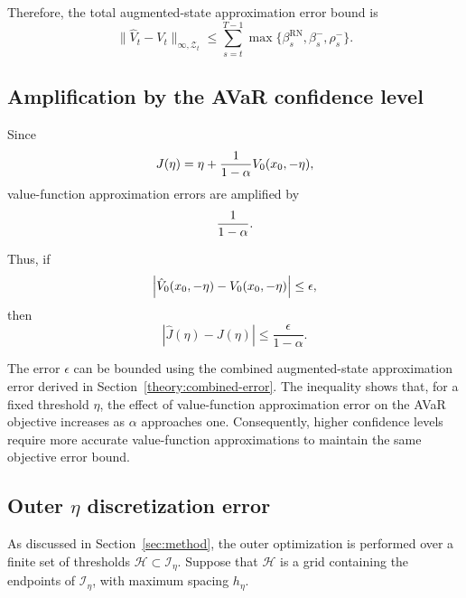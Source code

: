 Therefore, the total augmented-state approximation error bound is
\begin{equation}
	\|\hat{V}_t-V_t\|_{\infty,\mathcal{Z}_t}
	\leq
	\sum_{s=t}^{T-1}
	\max\{\beta_s^{\text{RN}},\beta_s^-,\rho_s^-\}.
	\label{total-augmented-error}
\end{equation}


\subsection{Amplification by the AVaR confidence level}
\label{theory:amplification}

Since
\begin{equation}
	J(\eta)
	=
	\eta
	+
	\frac{1}{1-\alpha}V_0(x_0,-\eta),
	\notag
	\label{avar-objective-theory}
\end{equation}
value-function approximation errors are amplified by
\begin{equation}
	\frac{1}{1-\alpha}.
	\notag
	\label{avar-amplification-factor}
\end{equation}

Thus, if
\begin{equation}
	\left|
	\hat V_0(x_0,-\eta)
	-
	V_0(x_0,-\eta)
	\right|
	\le
	\epsilon,
	\notag
	\label{initial-value-error}
\end{equation}
then
\begin{equation}
	\left|
	\hat J(\eta)-J(\eta)
	\right|
	\le
	\frac{\epsilon}{1-\alpha}.
	\label{avar-objective-error}
\end{equation}

The error $\epsilon$ can be bounded using the combined augmented-state approximation error derived in Section~\ref{theory:combined-error}. The inequality shows that, for a fixed threshold $\eta$, the effect of value-function approximation error on the AVaR objective increases as $\alpha$ approaches one. Consequently, higher confidence levels require more accurate value-function approximations to maintain the same objective error bound.



\subsection{Outer $\eta$ discretization error}
\label{theory:outer-eta-error}

As discussed in Section~\ref{sec:method}, the outer optimization is performed over a finite set of thresholds $\mathcal{H} \subset \mathcal{I}_\eta$. Suppose that $\mathcal{H}$ is a grid containing the endpoints of $\mathcal{I}_\eta$, with maximum spacing $h_\eta$.

